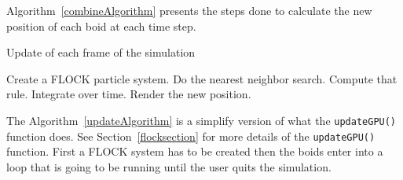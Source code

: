 Algorithm~\ref{combineAlgorithm} presents the steps done to calculate the new position of each boid at each time step.

\begin{algorithm}
\caption{Update of each frame of the simulation}
\label{updateAlgorithm}
\begin{algorithmic}
\STATE Create a FLOCK particle system.
\STATE Do the nearest neighbor search.
\STATE Compute that rule.
\STATE Integrate over time.
\STATE Render the new position.
\ENDFOR
\end{algorithmic}
\end{algorithm}

The Algorithm~\ref{updateAlgorithm} is a simplify version of what the \texttt{updateGPU()} function does. See Section~\ref{flocksection} for more details of the \texttt{updateGPU()} function. First a FLOCK system has to be created then the boids enter into a loop that is going to be running until the user quits the simulation.


